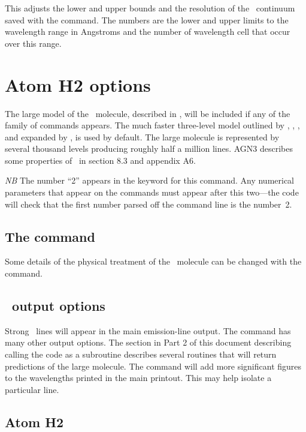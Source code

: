 This adjusts the lower and upper bounds and the resolution of the
\feii\ continuum
saved with the  command.
The numbers are the lower
and upper limits to the wavelength range in Angstroms and the number of
wavelength cell that occur over this range.

\section{Atom H2 options}

The large model of the \htwo\ molecule, described in \citet{Shaw2005},
will be included if any of the family of 
commands appears.
The much
faster three-level model outlined by \citet{Tielens1985a},
\citet{Burton1990}, \citet{Draine1996},
and expanded
by \citet{Elwert2006}, is used by default.
The large molecule is
represented by several thousand levels producing roughly half a million
lines.
AGN3 describes some properties of \htwo\ in section 8.3
and appendix A6.

\emph{NB}  The number ``2'' appears in the keyword for this command.
Any
numerical parameters that appear on the 
commands must appear after
this two---the code will check that the first number
parsed off the command line is the number~2.

\subsection{The  command}

Some details of the physical treatment of the \htwo\ molecule can be
changed with the  command.

\subsection{\htwo\ output options}

Strong \htwo\ lines will appear in the main emission-line output.
The  command has many other output options.
The
section in Part 2 of this document describing calling the code as a
subroutine describes several routines that will return predictions of the
large molecule.
The  command
will add more significant figures to the wavelengths printed in the main
printout.
This may help isolate a particular line.

\subsection{Atom H2}

